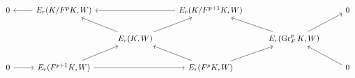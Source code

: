 \documentclass[crop,dvisvgm]{standalone}
\begin{document}
\[\begin {tikzcd}
      0
      & E_r(K/F^pK,W)
        \ar [l]
      && E_r(K/F^{p+1}K,W)
        \ar [ll]
      && 0
    \\&& E_r(K,W)
        \ar [ul]
        \ar [ur]
      && E_r(\operatorname {Gr}_F^pK,W)
        \ar [ul]
        \ar [ur]
    \\0
        \ar [r]
      & E_r(F^{p+1}K,W)
        \ar [rr]
        \ar [ur]
      && E_r(F^pK,W)
        \ar [ul]
        \ar [ur]
      && 0
        \ar [ul]
    \end {tikzcd}\]
\end{document}

